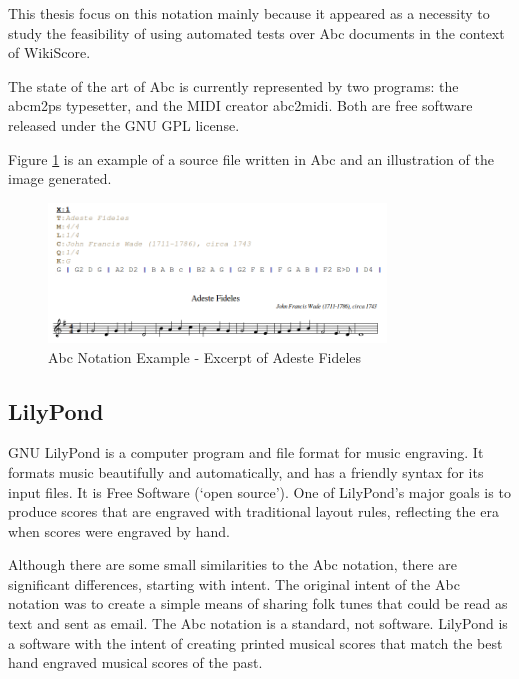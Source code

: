 \documentclass[main.tex]{files}
\begin{document}
This thesis focus on this notation mainly because it appeared as a necessity to study the
feasibility of using automated tests over Abc documents in the context of WikiScore.

The state of the art of Abc is currently represented by two programs: the abcm2ps typesetter,
and the MIDI creator abc2midi. Both are free software released under the GNU GPL license.

Figure \ref{fig:abc_example} is an example of a source file written in Abc and an illustration of
the image generated.

\begin{figure}[htb]
  \centering 
  \includegraphics[width=0.8\textwidth]{img/adeste_abc.png} 
  \caption{Abc Notation Example - Excerpt of Adeste Fideles}
  \label{fig:abc_example}
\end{figure}
% 
% 

\subsection{LilyPond}

GNU LilyPond\cite{lilypond:Online} is a computer program and file format for music engraving. It
formats music beautifully and automatically, and has a friendly syntax for its input files. It is
Free Software (‘open source’). One of LilyPond's major goals is to produce scores that are engraved
with traditional layout rules, reflecting the era when scores were engraved by hand.

Although there are some small similarities to the Abc notation, there are significant differences,
starting with intent. The original intent of the Abc notation was to create a simple means of
sharing folk tunes that could be read as text and sent as email. The Abc notation is a standard, not
software. LilyPond is a software with the intent of creating printed musical scores that match the
best hand engraved musical scores of the past.
\end{document}
